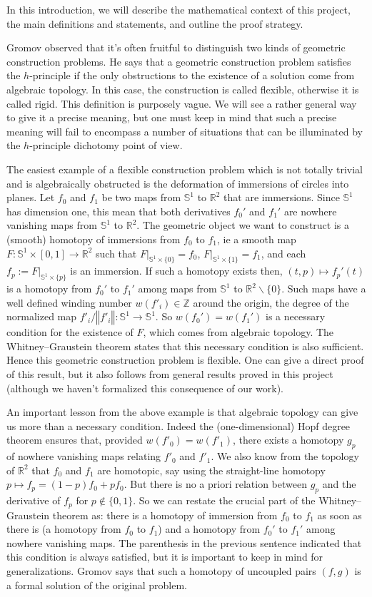 \documentclass[10pt,a4paper]{article}
\newcommand{\co}{\!:}
\newcommand{\rst}[2]{#1|_{#2}}
\begin{document}
In this introduction, we will describe the mathematical context of this
project, the main definitions and statements, and outline the proof
strategy.

Gromov observed that it's often fruitful to distinguish two kinds of geometric
construction problems. He says that a geometric construction problem satisfies
the $h$-principle if the only obstructions to the existence of a solution come
from algebraic topology. In this case, the construction is called flexible,
otherwise it is called rigid. This definition is purposely vague. We
will see a rather general way to give it a precise meaning, but one must keep
in mind that such a precise meaning will fail to encompass a number of
situations that can be illuminated by the $h$-principle dichotomy point of view.

The easiest example of a flexible construction problem which is not totally
trivial and is algebraically obstructed is the deformation of immersions
of circles into planes. Let $f_0$ and $f_1$ be two maps from $𝕊^1$ to $ℝ^2$
that are immersions. Since $𝕊^1$ has dimension one, this mean that both
derivatives $f_0'$ and $f_1'$ are nowhere vanishing maps from $𝕊^1$ to
$ℝ^2$. The geometric object we want to construct is a (smooth) homotopy
of immersions from $f_0$ to $f_1$, ie a smooth map $F \co 𝕊^1 × [0, 1] → ℝ^2$
such that $\rst{F}{𝕊^1 × \{0\}} = f_0$, $\rst{F}{𝕊^1 × \{1\}} = f_1$, and
each $f_p := \rst{F}{𝕊^1 × \{p\}}$ is an immersion. If such a homotopy
exists then, $(t, p) ↦ f_p'(t)$ is a homotopy from $f_0'$ to $f_1'$ among
maps from $𝕊^1$ to $ℝ^2 ∖ \{0\}$. Such maps have a well defined winding
number $w(f'_i) ∈ ℤ$ around the origin, the degree of the normalized map
$f'_i/‖f'_i‖ \co 𝕊^1 → 𝕊^1$. So $w(f_0') = w(f_1')$ is a necessary condition
for the existence of $F$, which comes from algebraic topology.  The
Whitney--Graustein theorem states that this necessary condition is also
sufficient. Hence this geometric construction problem is flexible.  One
can give a direct proof of this result, but it also
follows from general results proved in this project (although we
haven't formalized this consequence of our work).

An important lesson from the above example is that algebraic topology
can give us more than a necessary condition. Indeed the (one-dimensional)
Hopf degree theorem ensures that, provided $w(f'_0) = w(f'_1)$, there
exists a homotopy $g_p$ of nowhere vanishing maps relating $f'_0$ and
$f'_1$. We also know from the topology of $ℝ^2$ that $f_0$ and $f_1$ are
homotopic, say using the straight-line homotopy
$p ↦ f_p = (1-p)f_0 + pf_0$. But there is no a priori relation
between $g_p$ and the derivative of $f_p$ for $p ∉ \{0, 1\}$.
So we can restate the crucial part of the
Whitney--Graustein theorem as: there is a homotopy of immersion from
$f_0$ to $f_1$ as soon as there is (a homotopy from $f_0$ to $f_1$) and
a homotopy from $f_0'$ to $f_1'$ among nowhere vanishing maps. The
parenthesis in the previous sentence indicated that this condition is
always satisfied, but it is important to keep in mind for
generalizations. Gromov says that such a homotopy of uncoupled pairs
$(f, g)$ is a formal solution of the original problem.
\end{document}
